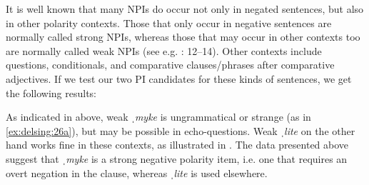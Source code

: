 \documentclass[output=paper]{langscibook}
\begin{document}
It is well known that many NPIs do occur not only in negated sentences, but also in other polarity contexts. Those that only occur in negative sentences are normally called strong NPIs, whereas those that may occur in other contexts too are normally called weak NPIs (see e.g. \citealt{Brandtler2010}: 12–14). Other contexts include questions, conditionals, and comparative clauses/phrases after comparative adjectives. If we test our two PI candidates for these kinds of sentences, we get the following results:


\ea\label{ex:delsing:26}\judgewidth{\#}
\z
\ex\label{ex:delsing:27}
\z
\z


As indicated in  above, weak \textit{ˌmyke} is ungrammatical or strange (as in \ref{ex:delsing:26a}), but may be possible in echo-questions. Weak \textit{ˌlite} on the other hand works fine in these contexts, as illustrated in . The data presented above suggest that \textit{ˌmyke} is a strong negative polarity item, i.e. one that requires an overt negation in the clause, whereas \textit{ˌlite} is used elsewhere.
\end{document}
